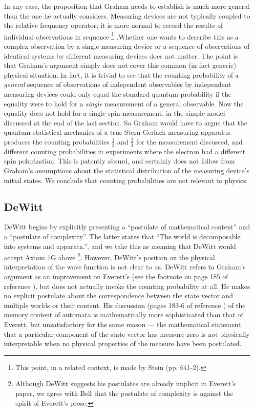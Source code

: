 \documentclass[aps,pra,12pt]{revtex4}
\begin{document}
In any case, the proposition that Graham needs to establish is much
more general than the one he actually considers.  
Measuring devices are not typically coupled to the
relative frequency operator; it is more normal to record the results of
individual observations in sequence \footnote{This point, in a related context,
is made by Stein\cite{stein} (pp. 641-2).}
.Whether one wants to describe this as
a complex observation by a single measuring device or 
a sequence of observations of identical systems by different measuring devices
does not matter. 
The point is that 
Graham's
argument simply does not cover this common (in fact generic) physical 
situation.
In fact, it is trivial to see that the counting probability of a {\em general}
sequence of observations of independent observables by independent 
measuring devices could only equal the standard quantum probability
if the equality were to hold for a {\em single} measurement of a general 
observable.  
Now the equality does not hold for a single spin measurement, in the
simple model discussed at the end of the last section.
So Graham would have to argue that the quantum statistical mechanics of a true
Stern-Gerlach measuring apparatus produces the counting 
probabilities $\frac{1}{3}$ and $\frac{2}{3}$ for the measurement discussed,
and different counting probabilities in experiments where the electron had
a different spin polarization.
This is patently absurd, and certainly does not follow 
from Graham's assumptions about the statistical 
distribution of the measuring device's initial states. 
We conclude that counting probabilities are not relevant to physics. 

\subsection{DeWitt}

DeWitt begins by explicitly presenting a ``postulate of mathematical
content'' and a ``postulate of complexity''.
The latter states 
that ``The world is decomposable into systems and apparata.'', 
and we take this as meaning that DeWitt would accept 
Axiom 1G above \footnote{Although DeWitt suggests his postulates are already 
implicit in Everett's paper,\cite{ev} 
we agree with Bell\cite{bell2} that
the postulate of complexity is against the spirit of Everett's 
prose.}. However, DeWitt's position on the physical interpretation of the wave
function is not clear to us. 
DeWitt refers to Graham's argument as an improvement on Everett's (see the
footnote on page 185 of reference \cite{mwbook}), but does not actually 
invoke the counting probability at all.
He makes no explicit postulate about the correspondence between the state
vector and multiple worlds or their content.
His discussion (pages 183-6 of reference \cite{mwbook}) of the memory
content of automata is mathematically more sophisticated than that of
Everett, but unsatisfactory for the same reason --- the mathematical
statement that a particular component of the state vector has measure
zero is not physically interpretable when no physical properties of
the measure have been postulated.
\end{document}
